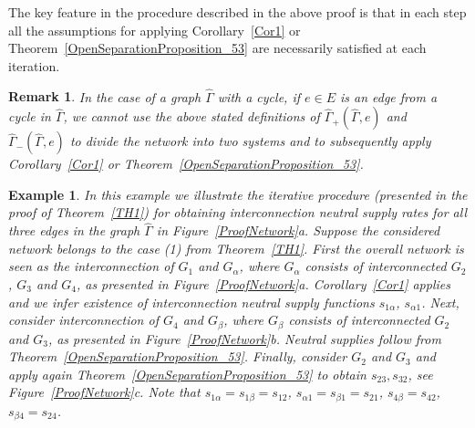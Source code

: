 \documentclass[11pt,a4paper,oneside,DIV=12,headings=small]{scrartcl}
\theoremstyle{plain}
\newtheorem{remark}[theorem]{Remark}
\newtheorem{example}[theorem]{Example}
\begin{document}
The key feature in the procedure described in the above proof is that in each step all the assumptions for applying Corollary~\ref{Cor1} or Theorem~\ref{OpenSeparationProposition_53} are necessarily satisfied at each iteration.

\begin{remark}
\label{RemarkAcyclic}
In the case of a graph $\hat{\Gamma}$ with a cycle, if $e \in E$ is an edge from a cycle in $\hat{\Gamma}$, we cannot use the above stated definitions of $\hat{\Gamma}_+(\hat{\Gamma},e)$ and $\hat{\Gamma}_-(\hat{\Gamma},e)$ to divide the network into two systems and to subsequently apply Corollary~\ref{Cor1} or Theorem~\ref{OpenSeparationProposition_53}.
\end{remark}


\begin{example}
\label{Example1}
In this example we illustrate the iterative procedure (presented in the proof of Theorem~\ref{TH1}) for obtaining interconnection neutral supply rates for all three edges in the graph $\hat{\Gamma}$ in Figure~\ref{ProofNetwork}a. Suppose the considered network belongs to the case (1) from Theorem~\ref{TH1}. First the overall network is seen as the interconnection of $G_1$ and $G_\alpha$, where $G_\alpha$ consists of interconnected $G_2$, $G_3$ and $G_4$, as presented in Figure~\ref{ProofNetwork}a. Corollary~\ref{Cor1} applies and we infer existence of interconnection neutral supply functions $s_{1\alpha}$, $s_{\alpha 1}$. Next, consider interconnection of $G_4$ and $G_\beta$, where $G_\beta$ consists of interconnected $G_2$ and $G_3$, as presented in Figure~\ref{ProofNetwork}b. Neutral supplies follow from Theorem~\ref{OpenSeparationProposition_53}. Finally, consider $G_2$ and $G_3$ and apply again Theorem~\ref{OpenSeparationProposition_53} to obtain $s_{23},s_{32}$, see Figure~\ref{ProofNetwork}c. Note that $s_{1\alpha}=s_{1\beta}=s_{12}$, $s_{\alpha 1}=s_{\beta 1}=s_{21}$, $s_{4 \beta}=s_{42}$, $s_{\beta 4}=s_{24}$.                
\end{example}


\end{document}

